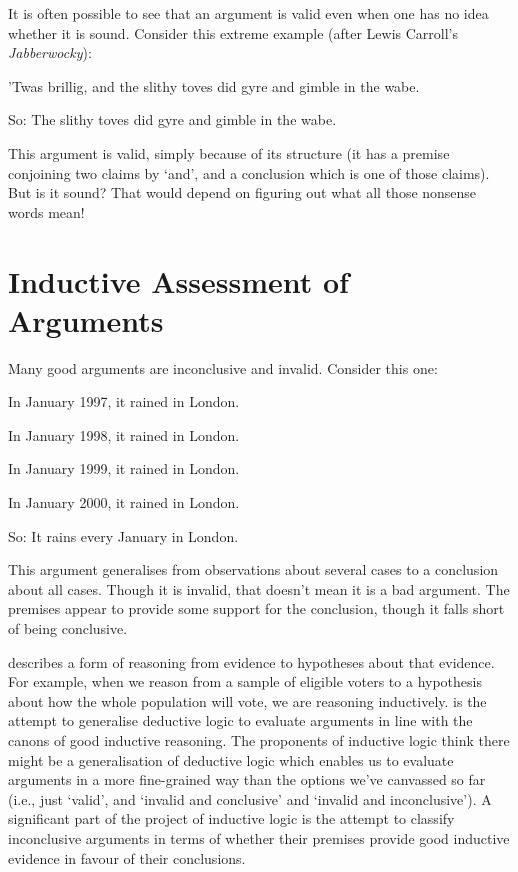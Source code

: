 It is often possible to see that an argument is valid even when one has no idea whether it is sound. Consider this extreme example (after Lewis Carroll's \emph{Jabberwocky}):
\begin{earg}
	\item[] ’Twas brillig, \textsf{and} the slithy toves did gyre and gimble in the wabe.
	\item[So:] The slithy toves did gyre and gimble in the wabe.
\end{earg} This argument is valid, simply because of its structure (it has a premise conjoining two claims by `and', and a conclusion which is one of those claims). But is it sound? That would depend on figuring out what all those nonsense words mean!

\section{Inductive Assessment of Arguments}
Many good arguments are inconclusive and invalid. Consider this one:
	\begin{earg}
		\item[] In January 1997, it rained in London.
		\item[] In January 1998, it rained in London.
		\item[] In January 1999, it rained in London.
		\item[] In January 2000, it rained in London.
	\item[So:] It rains every January in London.
\end{earg}
This argument generalises from observations about several cases to a conclusion about all cases. Though it is invalid, that doesn't mean it is a bad argument. The premises appear to provide some support for the conclusion, though it falls short of being conclusive. 

 describes a form of reasoning from evidence to hypotheses about that evidence. For example, when we reason from a sample of eligible voters to a hypothesis about how the whole population will vote, we are reasoning inductively.  is the attempt to generalise deductive logic to evaluate arguments in line with the canons of good inductive reasoning. The proponents of inductive logic think there might be a generalisation of deductive logic which enables us to evaluate arguments in a more fine-grained way than the options we've canvassed so far (i.e., just `valid', and `invalid and conclusive' and `invalid and inconclusive'). A significant part of the project of inductive logic is the attempt to classify inconclusive arguments in terms of whether their premises provide good inductive evidence in favour of their conclusions. 

